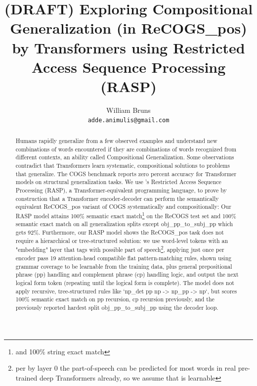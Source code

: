 \documentclass[11pt]{article}
\title{(DRAFT) Exploring Compositional Generalization (in ReCOGS\_pos) by Transformers using Restricted Access Sequence Processing (RASP)}
\author{William Bruns \\
  \texttt{adde.animulis@gmail.com}
}
\begin{document}
\maketitle
\begin{abstract}
Humans rapidly generalize from a few observed examples and understand new combinations of words encountered if they are combinations of words recognized from different contexts, an ability called Compositional Generalization. Some observations contradict that Transformers learn systematic, compositional solutions to problems that generalize. The COGS benchmark \cite{KimLinzen2020} reports zero percent accuracy for Transformer models on structural generalization tasks.
We use \cite{Weiss2021}'s Restricted Access Sequence Processing (RASP), a Transformer-equivalent programming language, to prove by construction that a Transformer encoder-decoder
can perform the semantically equivalent ReCOGS\_pos
\cite{Wu2023} variant of COGS systematically and compositionally: Our RASP model attains 100\% semantic exact match\footnote{and 100\% string exact match} on the ReCOGS test set and 100\% semantic exact match on all generalization splits except obj\_pp\_to\_subj\_pp which gets 92\%. Furthermore, our RASP model shows the ReCOGS\_pos task does not require a hierarchical or tree-structured solution: we use word-level tokens with an "embedding" layer that tags with possible part of speech\footnote{per \cite{tenney2019bertrediscoversclassicalnlp} by layer 0 the part-of-speech can be predicted for most words in real pre-trained deep Transformers already, so we assume that is learnable}, applying just once per encoder pass 19 attention-head compatible flat pattern-matching rules, shown using grammar coverage \cite{fuzzingbook2023:GrammarCoverageFuzzer} to be learnable from the training data, plus general prepositional phrase (pp) handling and complement phrase (cp) handling logic, and output the next logical form token (repeating until the logical form is complete). The model does not apply recursive, tree-structured rules like `np\_det pp np -> np\_pp -> np`, but scores 100\% semantic exact match on pp recursion, cp recursion previously, and the previously reported hardest split obj\_pp\_to\_subj\_pp using the decoder loop.

\end{abstract}
\end{document}
